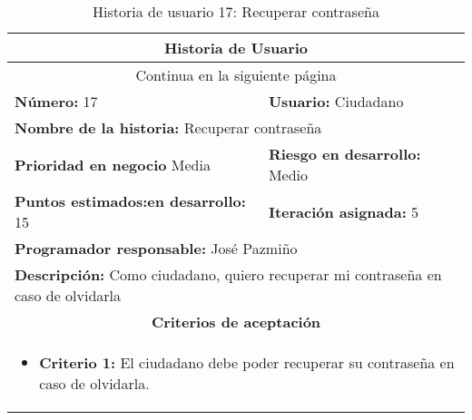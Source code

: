 

\begin{longtable}{|p{6.7cm}|p{6.7cm}|}
    \caption{Historia de usuario 17: Recuperar contraseña} \label{tab:historia-17}
    \\
    \hline
    \multicolumn{2}{|c|}{\textbf{Historia de Usuario}}                                                                      \\
    \hline

    \endfirsthead

    \hline
    \endhead

    \hline
    \multicolumn{2}{|c|}{{Continua en la siguiente página}}                                                                 \\
    \hline
    \endfoot

    \hline
    \endlastfoot

    \textbf{Número:} 17                                  & \textbf{Usuario:} Ciudadano                                      \\
    \hline
    \multicolumn{2}{|l|}{\textbf{Nombre de la historia:} Recuperar contraseña}                                              \\
    \hline
    \textbf{Prioridad en negocio}  Media                 & \textbf{Riesgo en desarrollo:} Medio                             \\
    \hline
    \textbf{\textbf{Puntos estimados:}en desarrollo:} 15 & \textbf{Iteración asignada:} 5                                   \\
    \hline
    \multicolumn{2}{|l|}{\textbf{Programador responsable:} José Pazmiño }                                                   \\
    \hline
    \multicolumn{2}{|p{13.4cm}|}{\textbf{Descripción:} Como ciudadano, quiero recuperar mi contraseña en caso de olvidarla} \\
    \hline
    \multicolumn{2}{|c|}{\textbf{Criterios de aceptación}}                                                                  \\
    \hline
    \multicolumn{2}{|p{13.4cm}|}{
    \begin{itemize}[label={},leftmargin=*, nosep]
        \item \textbf{Criterio 1:} El ciudadano debe poder recuperar su contraseña en caso de olvidarla.
    \end{itemize}
    }
    \\
\end{longtable}



